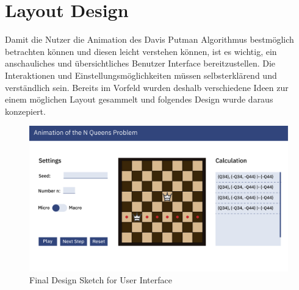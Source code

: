 \section{Layout Design}
Damit die Nutzer die Animation des Davis Putman Algorithmus bestmöglich betrachten können und diesen leicht verstehen können, ist es wichtig, ein anschauliches und übersichtliches Benutzer Interface bereitzustellen. Die Interaktionen und Einstellungsmöglichkeiten müssen selbsterklärend und verständlich sein. Bereits im Vorfeld wurden deshalb verschiedene Ideen zur einem möglichen Layout gesammelt und folgendes Design wurde daraus konzepiert. 
\begin{figure}[h]
  \centering
  \includegraphics[width=\textwidth]{img/Design_N_Queens}
  \caption{Final Design Sketch for User Interface}
  \label{fig:design}
\end{figure}